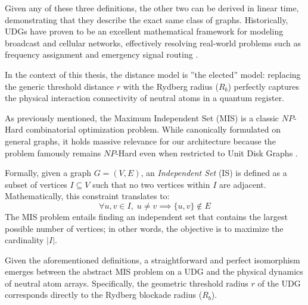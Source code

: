 Given any of these three definitions, the other two can be derived in linear time, demonstrating that they describe the exact same class of graphs. Historically, UDGs have proven to be an excellent mathematical framework for modeling broadcast and cellular networks, effectively resolving real-world problems such as frequency assignment and emergency signal routing \cite{CLARK1990165}. 

In the context of this thesis, the distance model is ''the elected'' model: replacing the generic threshold distance $r$ with the Rydberg radius ($R_b$) perfectly captures the physical interaction connectivity of neutral atoms in a quantum register.

As previously mentioned, the Maximum Independent Set (MIS) is a classic $NP$-Hard combinatorial optimization problem. While canonically formulated on general graphs, it holds massive relevance for our architecture because the problem famously remains $NP$-Hard even when restricted to Unit Disk Graphs \cite{CLARK1990165}.

Formally, given a graph $G = (V, E)$, an \textit{Independent Set} (IS) is defined as a subset of vertices $I \subseteq V$ such that no two vertices within $I$ are adjacent. Mathematically, this constraint translates to:
\begin{equation}
    \forall u, v \in I, \; u \neq v \implies \{u, v\} \notin E
\end{equation}
The MIS problem entails finding an independent set that contains the largest possible number of vertices; in other words, the objective is to maximize the cardinality $|I|$.

Given the aforementioned definitions, a straightforward and perfect isomorphism emerges between the abstract MIS problem on a UDG and the physical dynamics of neutral atom arrays. Specifically, the geometric threshold radius $r$ of the UDG corresponds directly to the Rydberg blockade radius ($R_b$). 


